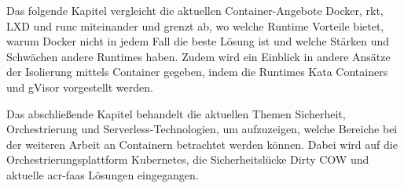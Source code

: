 Das folgende Kapitel vergleicht die aktuellen Container-Angebote Docker, rkt, LXD und runc miteinander und grenzt ab, wo welche Runtime Vorteile bietet, warum Docker nicht in jedem Fall die beste Lösung ist und welche Stärken und Schwächen andere Runtimes haben. Zudem wird ein Einblick in andere Ansätze der Isolierung mittels Container gegeben, indem die Runtimes Kata Containers und gVisor vorgestellt werden.

Das abschließende Kapitel behandelt die aktuellen Themen Sicherheit, Orchestrierung und Serverless-Technologien, um aufzuzeigen, welche Bereiche bei der weiteren Arbeit an Containern betrachtet werden können. Dabei wird auf die Orchestrierungsplattform Kubernetes, die Sicherheitslücke Dirty COW und aktuelle \gls{acr-faas} Lösungen eingegangen.